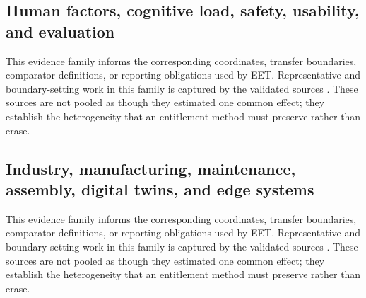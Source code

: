 \subsection{Human factors, cognitive load, safety, usability, and evaluation}
This evidence family informs the corresponding coordinates, transfer boundaries, comparator definitions, or reporting obligations used by EET. Representative and boundary-setting work in this family is captured by the validated sources \cite{Baumeister2017CognitiveCost,Lauer2021HMDChildren,Alessa2023Neurophysiological,Cox2025ClinicalAR,Sahoo2026LaserProjection,Drouot2022IndustrialAssembly,Yang2019AssemblyCognitiveLoad,Seeliger2023QualityInspection,AticiUlusu2021CognitiveLoad,OHagan2022EverydayPrivacy,Aschenbrenner2019HumanFactors,Derby2022DeviceUsability,Aromaa2020Awareness,Chaudhari2025SafetyHazards,Cardenas2026DisplayClutterSafety,Kostakopoulos2026RoboticUrologyReview,Chen2024ConstructionSafetyVLM,Loizeau2021FieldEvaluation,Suzuki2024PhysiologicalCognitiveLoad,Buchner2021CognitiveLoadMap,Lim2019UsabilityMeasures,Gong2024ARSafetyTraining,Dodoo2025XRWorkerSafety,Ma2026CognitionAwareSafety,GonnermannMuller2025ARLearningDesign,Hepperle2021Reproducibility,Vlake2024RATEXR,Dey2018UsabilityReview,Zhu2026CognitiveLoad,Bello2025NeurocognitiveXR,Shidende2023AccessibilityEvaluation,Senyer2025CulturalHeritageMobile,Knoben2026AccessibleWorkshops,VidalBalea2020CollaborativeIndustry,Begout2022ARAuthoringDT,Guedes2023IsThisReal,Mohanty2025PupilDilationAR}. These sources are not pooled as though they estimated one common effect; they establish the heterogeneity that an entitlement method must preserve rather than erase.

\subsection{Industry, manufacturing, maintenance, assembly, digital twins, and edge systems}
This evidence family informs the corresponding coordinates, transfer boundaries, comparator definitions, or reporting obligations used by EET. Representative and boundary-setting work in this family is captured by the validated sources \cite{Pantforder2024DigitalTwinsMR,Marino2024AssemblyGuidance,Hao2024DelayGuaranteed,Na2024GenerativeAIEdge,Ahn2020EnergyEfficient,Leins2024GuidedAssembly,Sahu2025EdgeEnergy,Seo2021CachePower,He2021DRLOffloading,Masood2020IndustrialAdoption,Zigart2022IndustrialSAR,Yin2023ARDigitalTwin,Sthapit2026DTXR,Kautsar2026Bidirectional,Qiu2019DigitalAssembly,Errandonea2020DTMaintenance,Palmarini2018Maintenance,Gattullo2022VisualAssets,Wang2016Assembly,Baroroh2021SmartManufacturing,Ho2022QualityControl,Breitkreuz2022RemoteMaintenance,FernandezDelAmo2018KnowledgeTransfer,Fugate2025ImmersiveXRMedical,Egger2020IntelligentManufacturing,Runji2023MaintenanceOperatorNeeds,Perno2025DigitalTwinsAR,VanDenBergh2025DigitalTwinOperators}. These sources are not pooled as though they estimated one common effect; they establish the heterogeneity that an entitlement method must preserve rather than erase.

